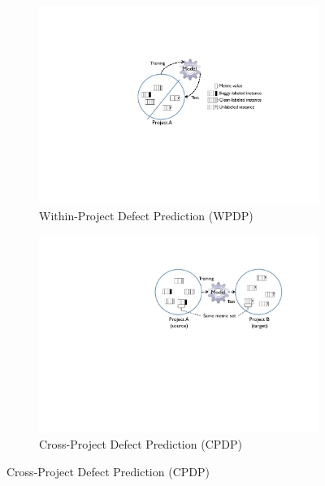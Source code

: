 \begin{figure}[t]

	\centering

 \begin{subfigure}[b]{0.8\linewidth}
 	\includegraphics[scale=0.5]{Figures/intro/p_within.pdf}
  	\caption{Within-Project Defect Prediction \tiny{(WPDP)}}
   	\label{fig:subfig1}
 \end{subfigure}

 \begin{subfigure}{0.8\linewidth}
 	\includegraphics[scale=0.5]{Figures/intro/p_cross.pdf}
  	\caption{Cross-Project Defect Prediction \tiny{(CPDP)}}
   	\label{fig:subfig2}
 \end{subfigure}


\end{figure}

